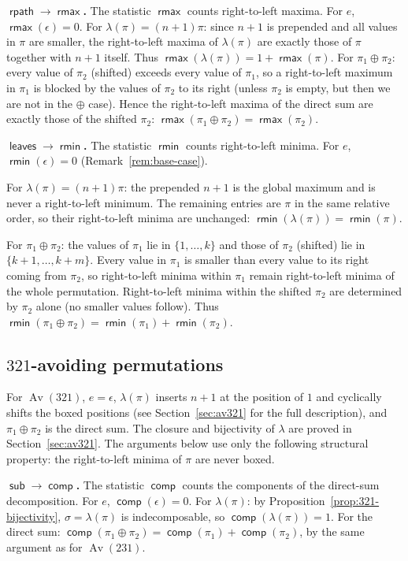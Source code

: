 \documentclass[a4paper,11pt]{article}
\theoremstyle{definition}
\DeclareMathOperator{\comp}{\mathsf{comp}}
\DeclareMathOperator{\rpath}{\mathsf{rpath}}
\DeclareMathOperator{\leaves}{\mathsf{leaves}}
\DeclareMathOperator{\rmin}{\mathsf{rmin}}
\DeclareMathOperator{\rmax}{\mathsf{rmax}}
\DeclareMathOperator{\subtrees}{\mathsf{sub}}
\DeclareMathOperator{\Av}{Av}
\begin{document}
\textbf{$\boldsymbol{\rpath \to \rmax}$.}
The statistic $\rmax$ counts right-to-left maxima. For
$e$, $\rmax(\epsilon) = 0$. For
$\lambda(\pi) = (n{+}1) \pi$: since $n{+}1$ is
prepended and all values in $\pi$ are smaller, the
right-to-left maxima of $\lambda(\pi)$ are exactly those
of $\pi$ together with $n{+}1$ itself. Thus
$\rmax(\lambda(\pi)) = 1 + \rmax(\pi)$.
For $\pi_1 \oplus \pi_2$: every value of $\pi_2$
(shifted) exceeds every value of $\pi_1$, so a
right-to-left maximum in $\pi_1$ is blocked by the
values of $\pi_2$ to its right (unless $\pi_2$ is empty,
but then we are not in the $\oplus$ case). Hence the
right-to-left maxima of the direct sum are exactly those
of the shifted $\pi_2$:
$\rmax(\pi_1 \oplus \pi_2) = \rmax(\pi_2)$.

\textbf{$\boldsymbol{\leaves \to \rmin}$.}
The statistic $\rmin$ counts right-to-left minima. For
$e$, $\rmin(\epsilon) = 0$ (Remark~\ref{rem:base-case}).

For $\lambda(\pi) = (n{+}1) \pi$: the prepended
$n{+}1$ is the global maximum and is never a
right-to-left minimum. The remaining entries are $\pi$
in the same relative order, so their right-to-left
minima are unchanged:
$\rmin(\lambda(\pi)) = \rmin(\pi)$.

For $\pi_1 \oplus \pi_2$: the values of $\pi_1$ lie in
$\{1, \ldots, k\}$ and those of $\pi_2$ (shifted) lie
in $\{k{+}1, \ldots, k{+}m\}$. Every value in $\pi_1$
is smaller than every value to its right coming from
$\pi_2$, so right-to-left minima within $\pi_1$ remain
right-to-left minima of the whole permutation.
Right-to-left minima within the shifted $\pi_2$ are
determined by $\pi_2$ alone (no smaller values follow).
Thus $\rmin(\pi_1 \oplus \pi_2)
= \rmin(\pi_1) + \rmin(\pi_2)$.

\subsection{$321$-avoiding permutations}\label{sec:dict-321}

For $\Av(321)$, $e = \epsilon$,
$\lambda(\pi)$ inserts $n{+}1$ at the position of $1$
and cyclically shifts the boxed positions (see Section~\ref{sec:av321} for
the full description), and $\pi_1 \oplus \pi_2$ is the
direct sum. The closure and bijectivity of $\lambda$ are
proved in Section~\ref{sec:av321}. The arguments below use only the
following structural property: the right-to-left
minima of $\pi$ are never boxed.

\textbf{$\boldsymbol{\subtrees \to \comp}$.}
The statistic $\comp$ counts the components of the
direct-sum decomposition. For $e$,
$\comp(\epsilon) = 0$. For $\lambda(\pi)$: by
Proposition~\ref{prop:321-bijectivity}, $\sigma = \lambda(\pi)$
is indecomposable, so $\comp(\lambda(\pi)) = 1$. For the direct sum:
$\comp(\pi_1 \oplus \pi_2)
= \comp(\pi_1) + \comp(\pi_2)$, by the same argument
as for $\Av(231)$.
\end{document}
